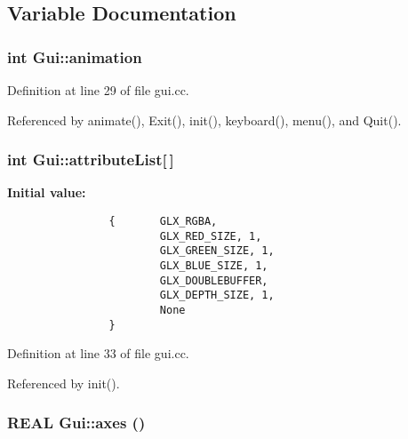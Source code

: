 \subsection{Variable Documentation}
\hypertarget{namespaceGui_8e6788190d414f842e08826fcefa496c}{
\subsubsection[{animation}]{\setlength{\rightskip}{0pt plus 5cm}int {\bf Gui::animation}}}
\label{namespaceGui_8e6788190d414f842e08826fcefa496c}




Definition at line 29 of file gui.cc.

Referenced by animate(), Exit(), init(), keyboard(), menu(), and Quit().\hypertarget{namespaceGui_a57d40ab8d008d5fd9e51830e254f2f8}{
\subsubsection[{attributeList}]{\setlength{\rightskip}{0pt plus 5cm}int {\bf Gui::attributeList}\mbox{[}$\,$\mbox{]}}}
\label{namespaceGui_a57d40ab8d008d5fd9e51830e254f2f8}


\textbf{Initial value:}

\begin{Code}\begin{verbatim} 
                {       GLX_RGBA, 
                        GLX_RED_SIZE, 1, 
                        GLX_GREEN_SIZE, 1,
                        GLX_BLUE_SIZE, 1, 
                        GLX_DOUBLEBUFFER, 
                        GLX_DEPTH_SIZE, 1, 
                        None 
                }
\end{verbatim}
\end{Code}


Definition at line 33 of file gui.cc.

Referenced by init().\hypertarget{namespaceGui_d8cd720a8150fa90f583d180f6a83b99}{
\subsubsection[{axes}]{\setlength{\rightskip}{0pt plus 5cm}REAL {\bf Gui::axes} ()}}
\label{namespaceGui_d8cd720a8150fa90f583d180f6a83b99}




